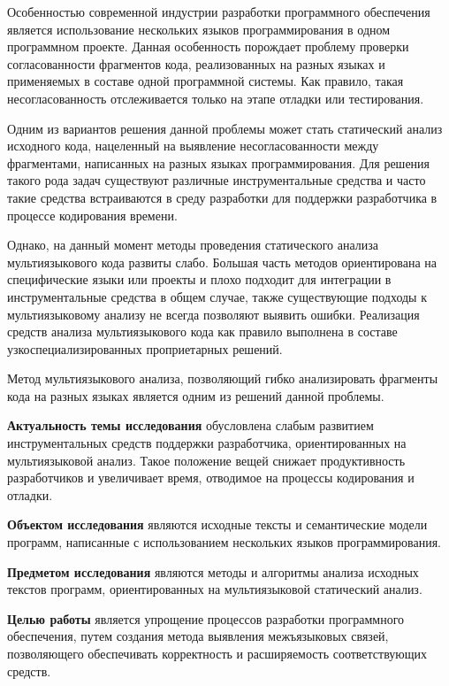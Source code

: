 \Introduction

Особенностью современной индустрии разработки программного обеспечения является использование нескольких языков программирования в
одном программном проекте. Данная особенность порождает проблему проверки согласованности фрагментов кода, реализованных на разных языках и
применяемых в составе одной программной системы. Как правило, такая несогласованность отслеживается только на этапе отладки или тестирования.

Одним из вариантов решения данной проблемы может стать статический анализ исходного кода, нацеленный на выявление несогласованности между фрагментами, написанных на разных языках программирования. Для решения такого рода задач существуют различные
инструментальные средства и часто такие средства встраиваются в среду разработки для
поддержки разработчика в процессе кодирования времени.

Однако, на данный момент методы проведения статического анализа мультиязыкового
кода развиты слабо. Большая часть методов ориентирована на специфические языки или проекты
и плохо подходит для интеграции в инструментальные средства в общем случае, также существующие подходы к мультиязыковому анализу не всегда позволяют выявить ошибки.
Реализация средств анализа мультиязыкового кода как правило выполнена в составе узкоспециализированных проприетарных решений.

Метод мультиязыкового анализа, позволяющий гибко анализировать
фрагменты кода на разных языках является одним из решений данной проблемы.

\textbf{Актуальность темы исследования} обусловлена слабым развитием
инструментальных средств поддержки разработчика, ориентированных на мультиязыковой анализ.
Такое положение вещей снижает продуктивность разработчиков и увеличивает время, отводимое
на процессы кодирования и отладки.

\textbf{Объектом исследования} являются исходные тексты и семантические модели
программ, написанные с использованием нескольких языков
программирования.

\textbf{Предметом исследования} являются методы и алгоритмы анализа исходных
текстов программ, ориентированных на мультиязыковой статический анализ.

\textbf{Целью работы} является упрощение процессов разработки программного обеспечения, путем создания метода выявления межъязыковых связей,
позволяющего обеспечивать корректность и расширяемость соответствующих средств.

